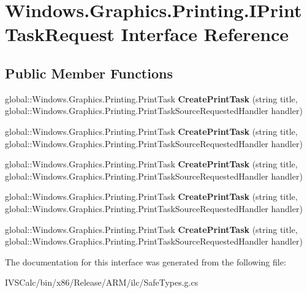 \hypertarget{interface_windows_1_1_graphics_1_1_printing_1_1_i_print_task_request}{}\section{Windows.\+Graphics.\+Printing.\+I\+Print\+Task\+Request Interface Reference}
\label{interface_windows_1_1_graphics_1_1_printing_1_1_i_print_task_request}
\subsection*{Public Member Functions}
\begin{DoxyCompactItemize}
\item 
\mbox{\label{interface_windows_1_1_graphics_1_1_printing_1_1_i_print_task_request_a1cca87a41bd39e3f2bcec243e930a038}} 
global\+::\+Windows.\+Graphics.\+Printing.\+Print\+Task {\bfseries Create\+Print\+Task} (string title, global\+::\+Windows.\+Graphics.\+Printing.\+Print\+Task\+Source\+Requested\+Handler handler)
\item 
\mbox{\label{interface_windows_1_1_graphics_1_1_printing_1_1_i_print_task_request_a1cca87a41bd39e3f2bcec243e930a038}} 
global\+::\+Windows.\+Graphics.\+Printing.\+Print\+Task {\bfseries Create\+Print\+Task} (string title, global\+::\+Windows.\+Graphics.\+Printing.\+Print\+Task\+Source\+Requested\+Handler handler)
\item 
\mbox{\label{interface_windows_1_1_graphics_1_1_printing_1_1_i_print_task_request_a1cca87a41bd39e3f2bcec243e930a038}} 
global\+::\+Windows.\+Graphics.\+Printing.\+Print\+Task {\bfseries Create\+Print\+Task} (string title, global\+::\+Windows.\+Graphics.\+Printing.\+Print\+Task\+Source\+Requested\+Handler handler)
\item 
\mbox{\label{interface_windows_1_1_graphics_1_1_printing_1_1_i_print_task_request_a1cca87a41bd39e3f2bcec243e930a038}} 
global\+::\+Windows.\+Graphics.\+Printing.\+Print\+Task {\bfseries Create\+Print\+Task} (string title, global\+::\+Windows.\+Graphics.\+Printing.\+Print\+Task\+Source\+Requested\+Handler handler)
\item 
\mbox{\label{interface_windows_1_1_graphics_1_1_printing_1_1_i_print_task_request_a1cca87a41bd39e3f2bcec243e930a038}} 
global\+::\+Windows.\+Graphics.\+Printing.\+Print\+Task {\bfseries Create\+Print\+Task} (string title, global\+::\+Windows.\+Graphics.\+Printing.\+Print\+Task\+Source\+Requested\+Handler handler)
\end{DoxyCompactItemize}


The documentation for this interface was generated from the following file\+:\begin{DoxyCompactItemize}
\item 
I\+V\+S\+Calc/bin/x86/\+Release/\+A\+R\+M/ilc/Safe\+Types.\+g.\+cs\end{DoxyCompactItemize}
